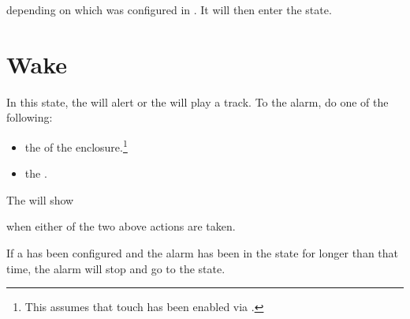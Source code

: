 depending on which was configured in . It will then enter the 
state.



\section{Wake} \label{Alarm - Wake} 

In this state, the  will alert or the  will play a track.  To
 the alarm, do one of the following:

\begin{itemize}
  \item {} the  of the enclosure.\footnote{ This assumes that touch
    has been enabled via \hyperref[Touch Settings]{}.}
  \item {} the .
\end{itemize}


The  will show

\begin{figure}[H]
\centering
\end{figure}

when either of the two above actions are taken.

\par\medskip

If a  has been configured and the alarm has been in the 
state for longer than that time, the alarm will stop and go to the 
state.


